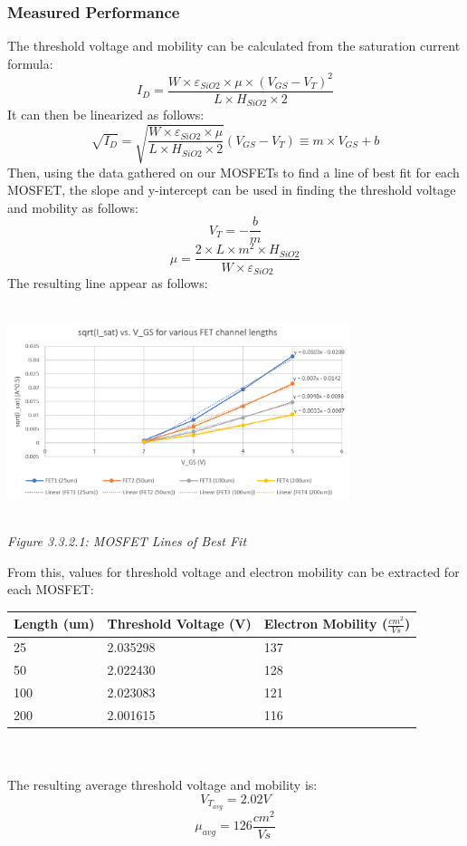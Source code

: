 \documentclass[12pt]{article}
\begin{document}
\subsubsection{Measured Performance}
The threshold voltage and mobility can be calculated from the saturation current formula:
\[I_D = \frac{W \times \varepsilon_{SiO2} \times \mu \times (V_{GS} - V_T)^2}{L \times H_{SiO2} \times 2} \]
It can then be linearized as follows:
\[ \sqrt{I_D} = \sqrt{\frac{W \times \varepsilon_{SiO2} \times \mu}{L \times H_{SiO2} \times 2}} (V_{GS} - V_T) \equiv m \times V_{GS} + b\]
Then, using the data gathered on our MOSFETs to find a line of best fit for each MOSFET, the slope and y-intercept can be used in finding the threshold voltage and mobility as follows:
\[ V_T = -\frac{b}{m} \]
\[ \mu = \frac{2 \times L \times m^2 \times H_{SiO2}}{W \times \varepsilon_{SiO2}}\]
The resulting line appear as follows:
\\
\\\centerline{\includegraphics[width=10cm] {IV Lines of Best Fit.PNG}}
\begin{center}
\\\emph{Figure 3.3.2.1: MOSFET Lines of Best Fit}
\end{center}
From this, values for threshold voltage and electron mobility can be extracted for each MOSFET:
\begin{center}
\begin{tabular}{|l|l|l|}
\hline
Length (um) & Threshold Voltage (V) & Electron Mobility ($\frac{cm^2}{Vs}$) \\ \hline
25          & 2.035298              & 137                                                                     \\ \hline
50          & 2.022430              & 128                                                                     \\ \hline
100         & 2.023083              & 121                                                                     \\ \hline
200         & 2.001615              & 116                                                                     \\ \hline
\end{tabular}
\end{center}
\\
\\The resulting average threshold voltage and mobility is:
\[V_T_{avg} = 2.02V \]
\[\mu_{avg} = 126\frac{cm^2}{Vs} \]
\end{document}
